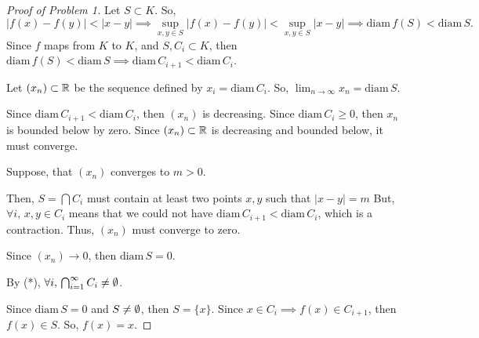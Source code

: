 \documentclass[../9extra]{subfiles}
\begin{document}
\begin{proof}[Proof of Problem 1]

	Let $S\subset K$. So, \[
		|f(x)-f(y)| < |x-y|
		\implies \underset{x,y \in S}{\sup} |f(x)-f(y)| < \underset{x,y \in S}{\sup} |x-y|
		\implies \text{diam}\,{f(S)} < \text{diam}\,{S}
		.\]
	Since $f$ maps from  $K$ to $K$,
	and $S, C_i \subset K$, then $ \text{diam}\,{f(S)} < \text{diam}\,{S} \implies \text{diam}\,{C_{i+1}} < \text{diam}\,{C_i}$.

	Let $(x_n)\subset \mathbb{R}$ be the sequence defined by $x_i = \text{diam}\,{C_i}$.
	So, $\lim_{n \to \infty} x_n = \text{diam}\,S$.

	Since $\text{diam}\,{C_{i+1}} < \text{diam}\,{C_i}$, then $(x_n)$ is decreasing.
	Since $\text{diam}\,{C_i}\ge 0$, then $x_n$ is bounded below by zero.
	Since $(x_n)\subset \mathbb{R}$ is decreasing and bounded below, it must converge.

	Suppose, that $(x_n)$ converges to $m>0$.

	Then, $S=\bigcap C_i$ must contain at least two points $x,y$ such that $|x-y| = m$
	But, $\forall i,\, x,y \in C_i$ means that we could not have $\text{diam}\,{C_{i+1}} < \text{diam}\,{C_i}$,
	which is a contraction.
	Thus, $(x_n)$ must converge to zero.

	Since $(x_n)\to 0$, then $\text{diam}\,S = 0$.

	By (*), $\forall i,\, \bigcap_{i=1}^{\infty} C_i \neq \emptyset$. %

	Since $\text{diam}\,{S} = 0$ and $S\neq \emptyset$,
	then $S = \{x\}$.
	Since $x \in C_i \implies f(x) \in C_{i+1}$,
	then $f(x) \in S$.
	So, $f(x) = x$.

\end{proof}
\end{document}

